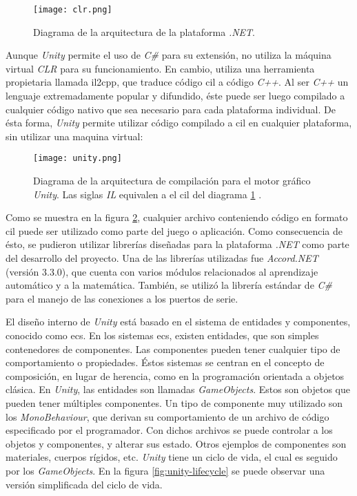\begin{figure}[H]
	\centering
    \texttt{[image: clr.png]}
    \caption{Diagrama de la arquitectura de la plataforma \emph{.NET}.}
	\label{fig:net-clr}
\end{figure}

Aunque \emph{Unity} permite el uso de \emph{C\#} para su extensión, no utiliza la máquina virtual \emph{CLR} para su funcionamiento. En cambio, utiliza una herramienta propietaria llamada \acrshort{il2cpp}, que traduce código \acrshort{cil} a código \emph{C++}. Al ser \emph{C++} un lenguaje extremadamente popular y difundido, éste puede ser luego compilado a cualquier código nativo que sea necesario para cada plataforma individual. De ésta forma, \emph{Unity} permite utilizar código compilado a \acrshort{cil} en cualquier plataforma, sin utilizar una maquina virtual:

\begin{figure}[H]
	\centering
    \texttt{[image: unity.png]}
    \caption{Diagrama de la arquitectura de compilación para el motor gráfico \emph{Unity}. Las siglas \emph{IL} equivalen a el \acrshort{cil} del diagrama \ref{fig:net-clr} \cite{il2cpp}.}
	\label{fig:unity}
\end{figure}

Como se muestra en la figura \ref{fig:unity}, cualquier archivo conteniendo código en formato \acrshort{cil} puede ser utilizado como parte del juego o aplicación. Como consecuencia de ésto, se pudieron utilizar librerías diseñadas para la plataforma \emph{.NET} como parte del desarrollo del proyecto. Una de las librerías utilizadas fue \emph{Accord.NET} (versión $3\text{.}3\text{.}0$), que cuenta con varios módulos relacionados al aprendizaje automático y a la matemática\cite{accord-net}. También, se utilizó la librería estándar de \emph{C\#} para el manejo de las conexiones a los puertos de serie.

El diseño interno de \emph{Unity} está basado en el sistema de entidades y componentes, conocido como \gls{ecs}. En los sistemas \acrshort{ecs}, existen entidades, que son simples contenedores de componentes. Las componentes pueden tener cualquier tipo de comportamiento o propiedades. Éstos sistemas se centran en el concepto de composición, en lugar de herencia, como en la programación orientada a objetos clásica. En \emph{Unity}, las entidades son llamadas \emph{GameObjects}. Estos son objetos que pueden tener múltiples componentes. Un tipo de componente muy utilizado son los \emph{MonoBehaviour}, que derivan su comportamiento de un archivo de código especificado por el programador. Con dichos archivos se puede controlar a los objetos y componentes, y alterar sus estado. Otros ejemplos de componentes son materiales, cuerpos rígidos, etc. \emph{Unity} tiene un ciclo de vida, el cual es seguido por los \emph{GameObjects}. En la figura \ref{fig:unity-lifecycle} se puede observar una versión simplificada del ciclo de vida.

